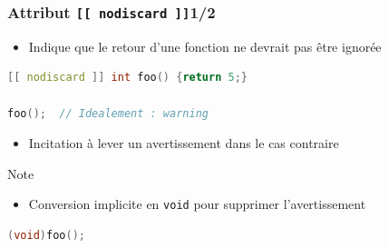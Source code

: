 \documentclass[C++.tex]{subfiles}
\begin{document}
\begin{frame}[fragile]
	\frametitle{Attribut \lstinline|[[ nodiscard ]]|\titlehfill{}1/2}
	\begin{itemize}
		\item Indique que le retour d'une fonction ne devrait pas être ignorée
	\end{itemize}

	\begin{lstlisting}[language=C++]
[[ nodiscard ]] int foo() {return 5;}

foo();  // Idealement : warning\end{lstlisting}

	\begin{itemize}
		\item Incitation à lever un avertissement dans le cas contraire
	\end{itemize}

	\begin{block}{Note}
		\begin{itemize}
			\item Conversion implicite en \lstinline|void| pour supprimer l'avertissement
		\end{itemize}
		\begin{lstlisting}[language=C++]
(void)foo();\end{lstlisting}

	\end{block}
\end{frame}
\end{document}
